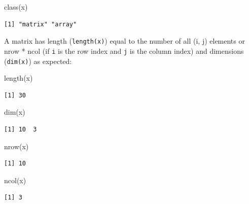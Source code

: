 \documentclass[
]{book}
\newenvironment{Shaded}{\begin{snugshade}}{\end{snugshade}}
\newcommand{\FunctionTok}[1]{\textcolor[rgb]{0.00,0.00,0.00}{#1}}
\newcommand{\NormalTok}[1]{#1}
\begin{document}
\begin{Shaded}
\begin{Highlighting}[]
\FunctionTok{class}\NormalTok{(x)}
\end{Highlighting}
\end{Shaded}

\begin{verbatim}
[1] "matrix" "array" 
\end{verbatim}

\begin{rmdnote}
A matrix has length (\texttt{length(x)}) equal to the number of all (i,
j) elements or nrow * ncol (if \texttt{i} is the row index and
\texttt{j} is the column index) and dimensions (\texttt{dim(x)}) as
expected:
\end{rmdnote}

\begin{Shaded}
\begin{Highlighting}[]
\FunctionTok{length}\NormalTok{(x)}
\end{Highlighting}
\end{Shaded}

\begin{verbatim}
[1] 30
\end{verbatim}

\begin{Shaded}
\begin{Highlighting}[]
\FunctionTok{dim}\NormalTok{(x)}
\end{Highlighting}
\end{Shaded}

\begin{verbatim}
[1] 10  3
\end{verbatim}

\begin{Shaded}
\begin{Highlighting}[]
\FunctionTok{nrow}\NormalTok{(x)}
\end{Highlighting}
\end{Shaded}

\begin{verbatim}
[1] 10
\end{verbatim}

\begin{Shaded}
\begin{Highlighting}[]
\FunctionTok{ncol}\NormalTok{(x)}
\end{Highlighting}
\end{Shaded}

\begin{verbatim}
[1] 3
\end{verbatim}
\end{document}
